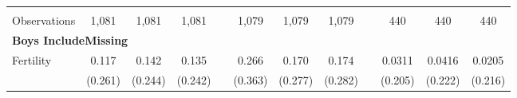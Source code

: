 \begin{landscape}
\begin{table}[htpb!]
\begin{center}
\begin{tabular}{lcccp{2mm}cccp{2mm}ccc}
\begin{footnotesize}\end{footnotesize}&\begin{footnotesize}\end{footnotesize}&\begin{footnotesize}\end{footnotesize}&\begin{footnotesize}\end{footnotesize}&\begin{footnotesize}\end{footnotesize}&\begin{footnotesize}\end{footnotesize}&\begin{footnotesize}\end{footnotesize}&\begin{footnotesize}\end{footnotesize}&\begin{footnotesize}\end{footnotesize}&\begin{footnotesize}\end{footnotesize}&\begin{footnotesize}\end{footnotesize}&\begin{footnotesize}\end{footnotesize}\\Observations&1,081&1,081&1,081&&1,079&1,079&1,079&&440&440&440\\
\multicolumn{12}{l}{\textbf{Boys IncludeMissing}}\\ 
Fertility&0.117&0.142&0.135&&0.266&0.170&0.174&&0.0311&0.0416&0.0205\\
&(0.261)&(0.244)&(0.242)&&(0.363)&(0.277)&(0.282)&&(0.205)&(0.222)&(0.216)\\

\end{tabular}
\end{center}
\end{table}
\end{landscape}
